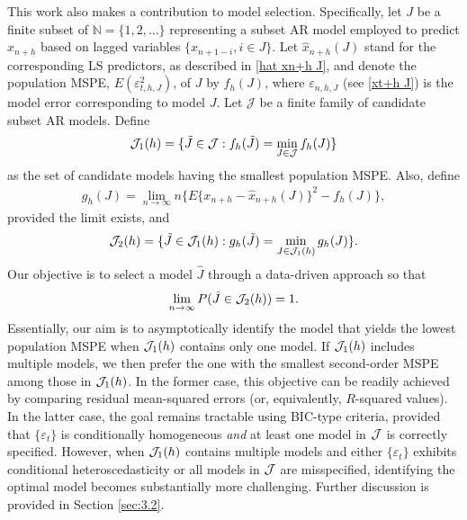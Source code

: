 \documentclass[ejsv2]{imsart}
\theoremstyle{plain}
\theoremstyle{definition}
\theoremstyle{remark}
\begin{document}
This work also makes a contribution to model selection. Specifically, let $J$ be a finite subset 
of $\mathbb{N}=\{1, 2,\ldots\}$ 
representing a subset AR model employed to predict $x_{n+h}$ based on lagged variables 
$\{x_{n+1-i}, i \in J\}$. Let
$\hat{x}_{n+h}(J)$ 
stand for the corresponding LS predictors, as described in \eqref{hat xn+h J}, and
denote the population MSPE, $E(\varepsilon_{t,h,J}^2)$, of $J$ by $f_h(J)$,
where $\varepsilon_{n, h, J}$ (see \eqref{xt+h J}) is the model error corresponding to model $J$. Let $\mathcal{J}$ be a finite family of candidate subset AR models. Define
\begin{eqnarray}
\label{M1}
{\cal J}_{1}(h)=\{\tilde{J}\in \mathcal{J}: f_h(\tilde{J})=\min\limits_{J\in \mathcal{J}}f_h(J)\}
\end{eqnarray}
as the set of candidate models having the smallest population MSPE. Also, define
\begin{eqnarray}
\label{ing4}
g_{h}(J)=\lim_{n \to \infty}
n\{E\{x_{n+h}-\hat{x}_{n+h}(J)\}^2-f_h(J)\},
\end{eqnarray}
provided the limit exists, and
\begin{eqnarray}
\label{M2}
{\cal J}_{2}(h) = \{\tilde{J}\in {\cal J}_{1}(h): g_h(\tilde{J})=\min\limits_{J\in {\cal J}_{1}(h)}g_h(J)\}.
\end{eqnarray}
Our objective is to select a model 
$\hat{J}$ 
through a data-driven approach so that
\begin{eqnarray}
\label{ing3}
\lim_{n \to \infty}
P(\hat{J} \in {\cal J}_{2}(h))=1.
\end{eqnarray}
Essentially, our aim is to asymptotically identify the model that yields the lowest population MSPE
when ${\cal J}_{1}(h)$ contains only one model.
If ${\cal J}_{1}(h)$
includes multiple models, we then prefer the one with the smallest second-order MSPE among
those in ${\cal J}_{1}(h)$.
In the former case, this objective can be readily achieved by comparing residual mean-squared errors (or, equivalently, $R$-squared values). %
In the latter case, the goal remains tractable using BIC-type criteria, provided that
$\{\varepsilon_t\}$
is conditionally homogeneous {\it and}
 at least one model in
${\cal J}$ is correctly specified. 
However, 
when ${\cal J}_{1}(h)$ contains multiple models
and either 
$\{\varepsilon_t\}$ 
exhibits conditional heteroscedasticity or all models in
${\cal J}$ are misspecified,
identifying the optimal model becomes substantially more challenging.
Further discussion is provided in Section
\ref{sec:3.2}.
\end{document}
